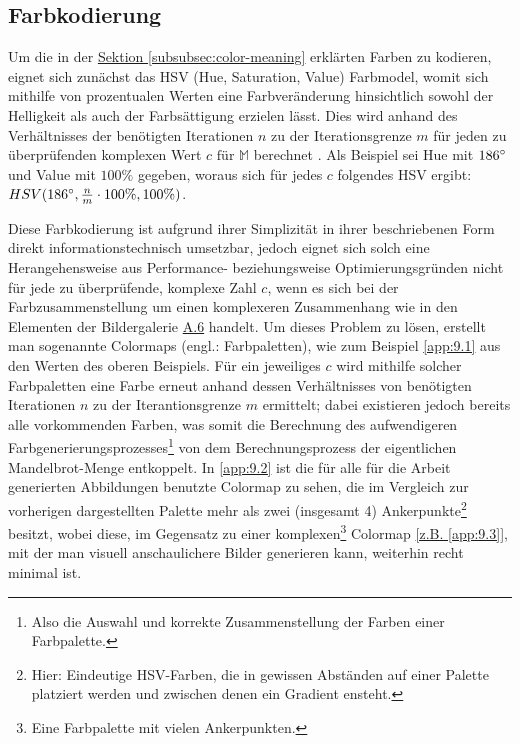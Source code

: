 \subsection{Farbkodierung}\label{subsec:color-coding}

Um die in der \hyperref[subsubsec:color-meaning]{Sektion \ref{subsubsec:color-meaning}}
erklärten Farben zu kodieren, eignet sich zunächst das HSV (Hue, Saturation, Value)
Farbmodel, womit sich mithilfe von prozentualen Werten eine
Farbveränderung hinsichtlich sowohl der Helligkeit
als auch der Farbsättigung erzielen lässt.
Dies wird anhand des Verhältnisses der benötigten Iterationen $n$ zu der Iterationsgrenze $m$
für jeden zu überprüfenden komplexen Wert $c \text{ für } \mathbb{M}$
berechnet \cite{robert_p_color_2022}.
Als Beispiel sei Hue mit $186\degree$ und Value mit $100\%$ gegeben, woraus
sich für jedes $c$ folgendes HSV ergibt:
$ HSV(186\degree, \frac{n}{m} \cdot 100\%, 100\%)$.

Diese Farbkodierung ist aufgrund ihrer Simplizität in ihrer beschriebenen
Form direkt informationstechnisch umsetzbar, jedoch eignet sich solch eine
Herangehensweise aus Performance- beziehungsweise Optimierungsgründen nicht
für jede zu überprüfende, komplexe Zahl $c$, wenn es sich bei der
Farbzusammenstellung um einen komplexeren Zusammenhang wie in den Elementen
der Bildergalerie \hyperref[app:6]{A.6} handelt.
Um dieses Problem zu lösen, erstellt man sogenannte Colormaps
(engl.: Farbpaletten), wie zum Beispiel \hyperref[app:9.1]{\ref{app:9.1}}
aus den Werten des oberen Beispiels.
Für ein jeweiliges $c$ wird mithilfe solcher Farbpaletten eine Farbe erneut anhand
dessen Verhältnisses von benötigten Iterationen $n$ zu der Iterantionsgrenze $m$
ermittelt; dabei existieren jedoch bereits alle vorkommenden Farben, was somit
die Berechnung des aufwendigeren Farbgenerierungsprozesses\footnote{
  Also die Auswahl und korrekte Zusammenstellung der Farben einer Farbpalette.
}
von dem Berechnungsprozess der eigentlichen Mandelbrot-Menge entkoppelt.
In \hyperref[app:9.2]{\ref{app:9.2}} ist die für alle für die Arbeit generierten
Abbildungen benutzte Colormap zu sehen, die im Vergleich zur vorherigen
dargestellten Palette mehr als zwei (insgesamt 4) Ankerpunkte\footnote{
  Hier: Eindeutige HSV-Farben, die in gewissen Abständen auf einer Palette
  platziert werden und zwischen denen ein Gradient ensteht.
} besitzt, wobei diese, im Gegensatz zu einer komplexen\footnote{
  Eine Farbpalette mit vielen Ankerpunkten.
} Colormap \hyperref[app:9.3]{[z.B. \ref{app:9.3}]},
mit der man visuell anschaulichere Bilder generieren kann,
weiterhin recht minimal ist.